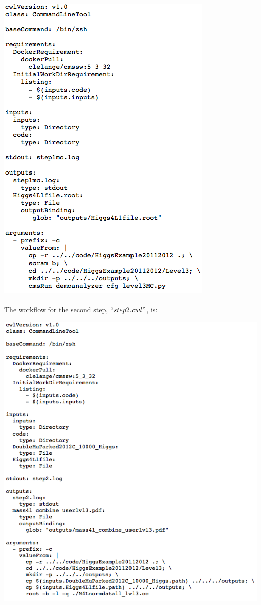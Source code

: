 \documentclass[letter]{article}
\begin{document}
\includegraphics[scale=0.45]{step1mc} \\ \\
\vspace{5pt} The workflow for the second step, $``step2.cwl"$, is:
\begin{center}
\includegraphics[scale=0.5]{step2}
\end{center}
\end{document}
